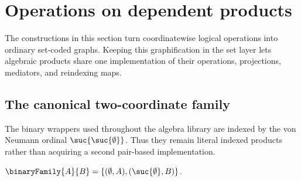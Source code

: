 



\section{Operations on dependent products}

The constructions in this section turn coordinatewise logical operations into
ordinary set-coded graphs.  Keeping this graphification in the set layer lets
algebraic products share one implementation of their operations, projections,
mediators, and reindexing maps.

\subsection{The canonical two-coordinate family}

The binary wrappers used throughout the algebra library are indexed by the
von Neumann ordinal $\suc{\suc{\emptyset}}$.  Thus they remain literal indexed
products rather than acquiring a second pair-based implementation.

\begin{definition}\label{binary_family}
    $\binaryFamily{A}{B}
        =\{(\emptyset,A),(\suc{\emptyset},B)\}$.
\end{definition}

